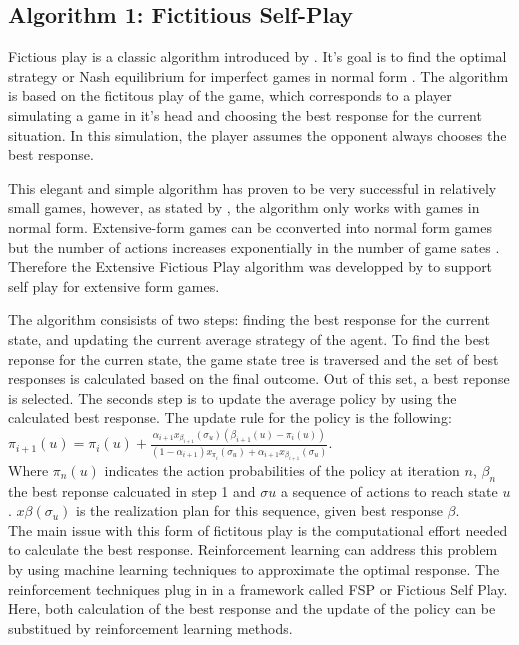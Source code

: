 \documentclass[10pt,a4paper]{article}
\begin{document}
\subsection{Algorithm 1: Fictitious Self-Play}
\label{sub:xfsp}
Fictious play is a classic algorithm introduced by \cite{fp}. It's goal is to find the optimal strategy or Nash equilibrium for imperfect games in normal form \cite{MCFSP}. The algorithm is based on the fictitous play of the game, which corresponds to a player simulating a game in it's head and choosing the best response for the current situation. In this simulation, the player assumes the opponent always chooses the best response.

This elegant and simple algorithm has proven to be very successful in relatively small games, however, as stated by \cite{fsp-ext}, the algorithm only works with games in normal form. Extensive-form games can be cconverted into normal form games but the number of actions increases exponentially in the number of game sates \cite{fsp-ext}.
Therefore the Extensive Fictious Play algorithm was developped by \cite{fsp-ext} to support self play for extensive form games.

The algorithm consisists of two steps: finding the best response for the current state, and updating the current average strategy of the agent.
To find the best reponse for the curren state, the game state tree is traversed and the set of best responses is calculated based on the final outcome. Out of this set, a best reponse is selected.
The seconds step is to update the average policy by using the calculated best response. The update rule for the policy is the following:
\begin{math}
\pi_{i+1}(u) = \pi_{i}(u) + \frac{\alpha_{i+1}x_{\beta_{i+1}}(\sigma_{u})(\beta_{i+1}(u) - \pi_i(u))}{(1-\alpha_{i+1})x_{\pi_i}(\sigma_{u}) + \alpha_{i+1}x_{\beta_{i+1}}(\sigma_u)}
\end{math}.\\
Where $\pi_n(u)$ indicates the action probabilities of the policy at iteration $n$, $\beta_n$ the best reponse calcuated in step 1 and $\sigma{u}$ a sequence of actions to reach state $u$. $x{\beta}(\sigma_u)$ is the realization plan for this sequence, given best response $\beta$.\\
The main issue with this form of fictitous play is the computational effort needed to calculate the best response. 
Reinforcement learning can address this problem by using machine learning techniques to approximate the optimal response.
The reinforcement techniques plug in in a framework called FSP or Fictious Self Play. Here, both calculation of the best response and the update of the policy can be substitued by reinforcement learning methods.
\end{document}
